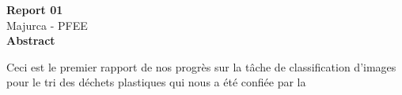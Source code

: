 \documentclass[11pt]{article}
\begin{document}
\begin{titlepage}
  \begin{center}
    \vspace*{1cm} \Huge \textbf{Report 01}\\
    \vspace*{1\baselineskip} \Large Majurca - PFEE\\
    \vspace*{2\baselineskip} \large
    \textbf{Abstract}
    \vspace*{1\baselineskip}
  \end{center}
  Ceci est le premier rapport de nos progrès sur la tâche de classification
  d'images pour le tri des déchets plastiques qui nous a été confiée par la

\end{titlepage}
\end{document}
